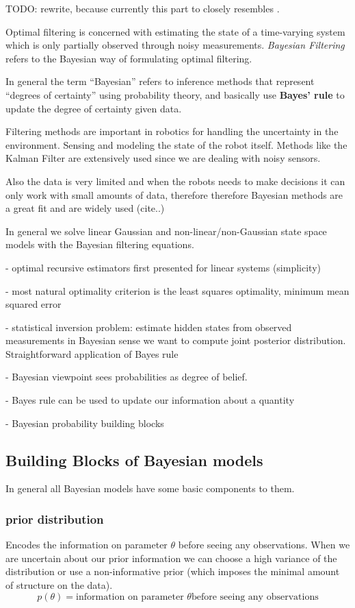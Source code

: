 TODO:  rewrite, because currently this part to closely resembles \citet{sarkka2013bayesian}.

Optimal filtering is concerned with estimating the state of a time-varying system
which is only partially observed through noisy measurements.
\textit{Bayesian Filtering} refers to the Bayesian way of formulating optimal
filtering.

In general the term ``Bayesian'' refers to inference methods that represent
``degrees of certainty'' using probability theory, and basically use \textbf{Bayes' rule}
to update the degree of certainty given data.

Filtering methods are important in robotics for handling the uncertainty in the
environment. Sensing and modeling the state of the robot itself.
Methods like the Kalman Filter are extensively used since we are dealing with noisy sensors.

Also the data is very limited and when the robots needs to make
decisions it can only work with small amounts of data, therefore
therefore Bayesian methods are a great fit and are widely used (cite..)

In general we solve linear Gaussian and non-linear/non-Gaussian state space
models with the Bayesian filtering equations.

- optimal recursive estimators first presented for linear systems (simplicity)

- most natural optimality criterion is the least squares optimality,
minimum mean squared error

- statistical inversion problem: estimate hidden states from observed
measurements in Bayesian sense we want to compute joint posterior distribution.
Straightforward application of Bayes rule

- Bayesian viewpoint sees probabilities as degree of belief.

- Bayes rule can be used to update our information about a quantity

- Bayesian probability building blocks

\subsection{Building Blocks of Bayesian models}
In general all Bayesian models have some basic components to them.

\subsubsection{prior distribution}
Encodes the information on parameter $\theta$ before seeing any
observations. When we are uncertain about our prior information
we can choose a high variance of the distribution or use a
non-informative prior (which imposes the minimal amount of structure
on the data).
$$ p(\theta) = \text{information on parameter } \theta
\text{before seeing any observations} $$

